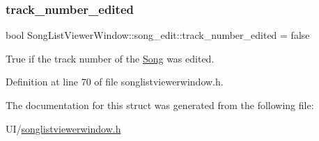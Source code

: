 \subsubsection{\texorpdfstring{track\+\_\+number\+\_\+edited}{track\_number\_edited}}
{\footnotesize\ttfamily bool Song\+List\+Viewer\+Window\+::song\+\_\+edit\+::track\+\_\+number\+\_\+edited = false}



True if the track number of the \mbox{\hyperlink{class_song}{Song}} was edited. 



Definition at line 70 of file songlistviewerwindow.\+h.



The documentation for this struct was generated from the following file\+:\begin{DoxyCompactItemize}
\item 
U\+I/\mbox{\hyperlink{songlistviewerwindow_8h}{songlistviewerwindow.\+h}}\end{DoxyCompactItemize}
